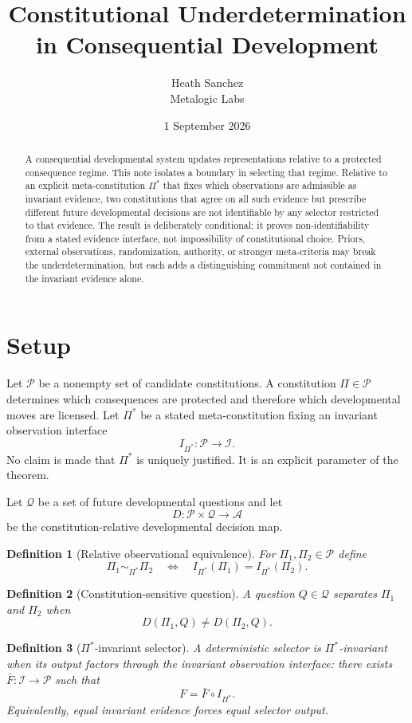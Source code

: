 \documentclass[11pt]{article}
\title{Constitutional Underdetermination in Consequential Development}
\author{Heath Sanchez\\Metalogic Labs}
\date{1 September 2026}
\newtheorem{definition}{Definition}
\begin{document}
\maketitle
\begin{abstract}
A consequential developmental system updates representations relative to a protected consequence regime. This note isolates a boundary in selecting that regime. Relative to an explicit meta-constitution $\Pi^*$ that fixes which observations are admissible as invariant evidence, two constitutions that agree on all such evidence but prescribe different future developmental decisions are not identifiable by any selector restricted to that evidence. The result is deliberately conditional: it proves non-identifiability from a stated evidence interface, not impossibility of constitutional choice. Priors, external observations, randomization, authority, or stronger meta-criteria may break the underdetermination, but each adds a distinguishing commitment not contained in the invariant evidence alone.
\end{abstract}

\section{Setup}
Let $\mathcal P$ be a nonempty set of candidate constitutions. A constitution $\Pi\in\mathcal P$ determines which consequences are protected and therefore which developmental moves are licensed. Let $\Pi^*$ be a stated meta-constitution fixing an invariant observation interface
\[
I_{\Pi^*}:\mathcal P\to\mathcal I.
\]
No claim is made that $\Pi^*$ is uniquely justified. It is an explicit parameter of the theorem.

Let $\mathcal Q$ be a set of future developmental questions and let
\[
D:\mathcal P\times\mathcal Q\to\mathcal A
\]
be the constitution-relative developmental decision map.

\begin{definition}[Relative observational equivalence]
For $\Pi_1,\Pi_2\in\mathcal P$ define
\[
\Pi_1\sim_{\Pi^*}\Pi_2
\quad\Longleftrightarrow\quad
I_{\Pi^*}(\Pi_1)=I_{\Pi^*}(\Pi_2).
\]
\end{definition}

\begin{definition}[Constitution-sensitive question]
A question $Q\in\mathcal Q$ separates $\Pi_1$ and $\Pi_2$ when
\[
D(\Pi_1,Q)\neq D(\Pi_2,Q).
\]
\end{definition}

\begin{definition}[$\Pi^*$-invariant selector]
A deterministic selector is $\Pi^*$-invariant when its output factors through the invariant observation interface: there exists $\bar F:\mathcal I\to\mathcal P$ such that
\[
F=\bar F\circ I_{\Pi^*}.
\]
Equivalently, equal invariant evidence forces equal selector output.
\end{definition}
\end{document}
